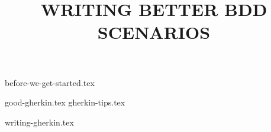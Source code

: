 \documentclass[a4paper,12pt]{report}
\title{WRITING BETTER BDD SCENARIOS}
\begin{document}
{before-we-get-started.tex}

{good-gherkin.tex}
{gherkin-tips.tex}

{writing-gherkin.tex}
\end{document}

